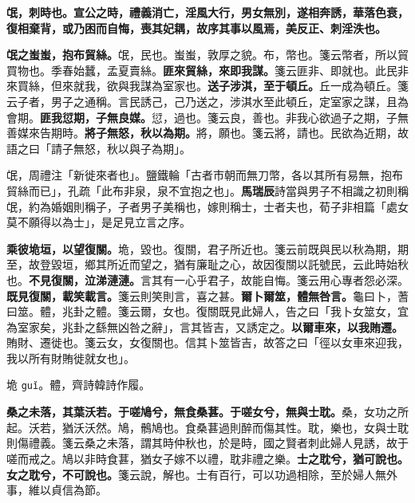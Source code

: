 
\textbf{氓，刺時也。宣公之時，禮義消亡，淫風大行，男女無別，遂相奔誘，華落色衰，復相棄背，或乃困而自悔，喪其妃耦，故序其事以風焉，美反正、刺淫泆也。}

\textbf{氓之蚩蚩，抱布貿絲。}{\footnotesize 氓，民也。蚩蚩，敦厚之貌。布，幣也。箋云幣者，所以貿買物也。季春始蠶，孟夏賣絲。}\textbf{匪來貿絲，來即我謀。}{\footnotesize 箋云匪非、即就也。此民非來買絲，但來就我，欲與我謀為室家也。}\textbf{送子涉淇，至于頓丘。}{\footnotesize 丘一成為頓丘。箋云子者，男子之通稱。言民誘己，己乃送之，涉淇水至此頓丘，定室家之謀，且為會期。}\textbf{匪我愆期，子無良媒。}{\footnotesize 愆，過也。箋云良，善也。非我心欲過子之期，子無善媒來告期時。}\textbf{將子無怒，秋以為期。}{\footnotesize 將，願也。箋云將，請也。民欲為近期，故語之曰「請子無怒，秋以與子為期」。}

\begin{quoting}氓，周禮注「新徙來者也」。鹽鐵輪「古者市朝而無刀幣，各以其所有易無，抱布貿絲而已」，孔疏「此布非泉，泉不宜抱之也」。\textbf{馬瑞辰}詩當與男子不相識之初則稱氓，約為婚姻則稱子，子者男子美稱也，嫁則稱士，士者夫也，荀子非相篇「處女莫不願得以為士」，是足見立言之序。\end{quoting}

\textbf{乘彼垝垣，以望復關。}{\footnotesize 垝，毀也。復關，君子所近也。箋云前既與民以秋為期，期至，故登毀垣，鄉其所近而望之，猶有廉耻之心，故因復關以託號民，云此時始秋也。}\textbf{不見復關，泣涕漣漣。}{\footnotesize 言其有一心乎君子，故能自悔。箋云用心專者怨必深。}\textbf{既見復關，載笑載言。}{\footnotesize 箋云則笑則言，喜之甚。}\textbf{爾卜爾筮，體無咎言。}{\footnotesize 龜曰卜，蓍曰筮。體，兆卦之體。箋云爾，女也。復關既見此婦人，告之曰「我卜女筮女，宜為室家矣，兆卦之繇無凶咎之辭」，言其皆吉，又誘定之。}\textbf{以爾車來，以我賄遷。}{\footnotesize 賄財、遷徙也。箋云女，女復關也。信其卜筮皆吉，故答之曰「徑以女車來迎我，我以所有財賄徙就女也」。}

\begin{quoting}垝 \texttt{guǐ}。體，齊詩韓詩作履。\end{quoting}

\textbf{桑之未落，其葉沃若。于嗟鳩兮，無食桑葚。于嗟女兮，無與士耽。}{\footnotesize 桑，女功之所起。沃若，猶沃沃然。鳩，鶻鳩也。食桑葚過則醉而傷其性。耽，樂也，女與士耽則傷禮義。箋云桑之未落，謂其時仲秋也，於是時，國之賢者刺此婦人見誘，故于嗟而戒之。鳩以非時食葚，猶女子嫁不以禮，耽非禮之樂。}\textbf{士之耽兮，猶可說也。女之耽兮，不可說也。}{\footnotesize 箋云說，解也。士有百行，可以功過相除，至於婦人無外事，維以貞信為節。}

